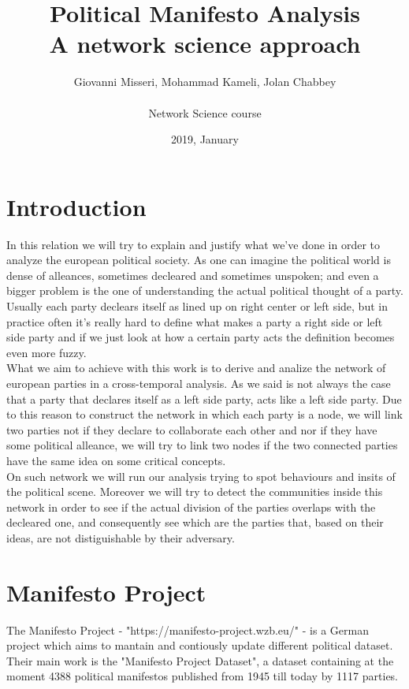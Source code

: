 \documentclass{article}%
\title{%
  Political Manifesto Analysis \\
  \large A network science approach}
\date{2019, January}
\author{Giovanni Misseri, Mohammad Kameli, Jolan Chabbey \\ \\ 
Network Science course}
\begin{document}
\maketitle
\section{Introduction}
In this relation we will try to explain and justify what we've done in order to analyze the european political society.
As one can imagine the political world is dense of alleances, sometimes decleared and sometimes unspoken; and even a bigger problem is the one of understanding the actual political thought of a party.
Usually each party declears itself as lined up on right center or left side, but in practice often it's really hard to define what makes a party a right side or left side party and if we just look at how a certain party acts the definition becomes even more fuzzy.\\

What we aim to achieve with this work is to derive and analize the network of european parties in a cross-temporal analysis. As we said is not always the case that a party that declares itself as a left side party, acts like a left side party. Due to this reason to construct the network in which each party is a node, we will link two parties not if they declare to collaborate each other and nor if they have some political alleance, we will try to link two nodes if the two connected parties have the same idea on some critical concepts.\\

On such network we will run our analysis trying to spot behaviours and insits of the political scene. Moreover we will try to detect the communities inside this network in order to see if the actual division of the parties overlaps with the decleared one, and consequently see which are the parties that, based on their ideas, are not distiguishable by their adversary.

\section{Manifesto Project}

The Manifesto Project - "https://manifesto-project.wzb.eu/" - is a German project which aims to mantain and contiously update different political dataset. Their main work is the "Manifesto Project Dataset", a dataset containing at the moment 4388 political manifestos published from 1945 till today by 1117 parties.
\end{document}

